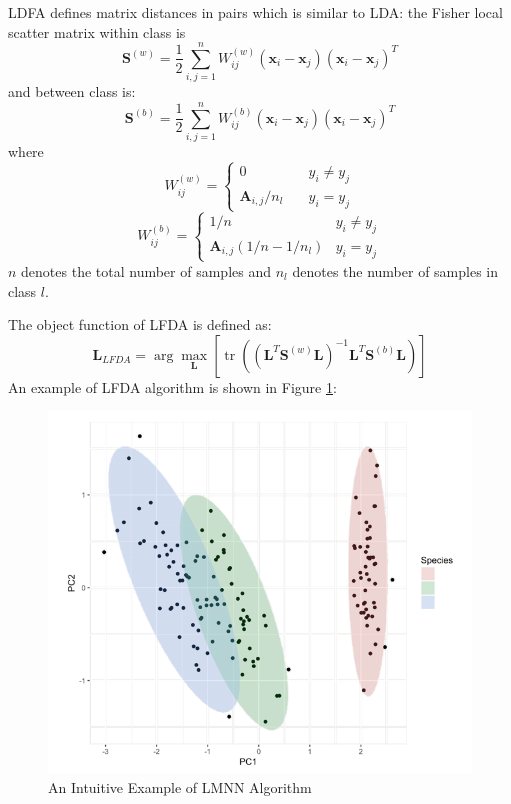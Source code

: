        LDFA defines matrix distances in pairs which is similar to LDA: the Fisher local scatter matrix within class is
        $$
            \mathbf{S}^{(w)} =\frac{1}{2} \sum_{i, j=1}^{n} W_{i j}^{(w)}\left(\mathbf{x}_{i}-\mathbf{x}_{j}\right)\left(\mathbf{x}_{i}-\mathbf{x}_{j}\right)^{T}
        $$
        and between class is:
        $$
            \mathbf{S}^{(b)} =\frac{1}{2} \sum_{i, j=1}^{n} W_{i j}^{(b)}\left(\mathbf{x}_{i}-\mathbf{x}_{j}\right)\left(\mathbf{x}_{i}-\mathbf{x}_{j}\right)^{T}
        $$
        where
        $$
            W_{i j}^{(w)}=\left\{
            \begin{array}{ll}
                0 \quad  & y_{i} \neq y_{j} \\
                \mathbf{A}_{i, j} / n_{l} \quad  & y_{i}=y_{j}
            \end{array}\right.
        $$
        $$
            W_{i j}^{(b)}=\left\{
            \begin{array}{ll}
                1 / n & y_{i} \neq y_{j} \\
                \mathbf{A}_{i, j}\left(1 / n-1 / n_{l}\right) & y_{i}=y_{j}
            \end{array}\right.
        $$
        $n$ denotes the total number of samples and $n_l$ denotes the number of samples in class $l$.
        
        The object function of LFDA is defined as:
        $$
            \mathbf{L}_{L F D A}=\arg \max _{\mathbf{L}}\left[\operatorname{tr}\left(\left(\mathbf{L}^{T} \mathbf{S}^{(w)} \mathbf{L}\right)^{-1} \mathbf{L}^{T} \mathbf{S}^{(b)} \mathbf{L}\right)\right]
        $$
        An example of LFDA algorithm is shown in Figure \ref{fig:lfda}:
        \begin{figure}[htbp]
            \centering
            \includegraphics[width=0.6\linewidth]{img/Lfda-principle.png}
            \caption{An Intuitive Example of LMNN Algorithm}
            \label{fig:lfda}
        \end{figure}
    

